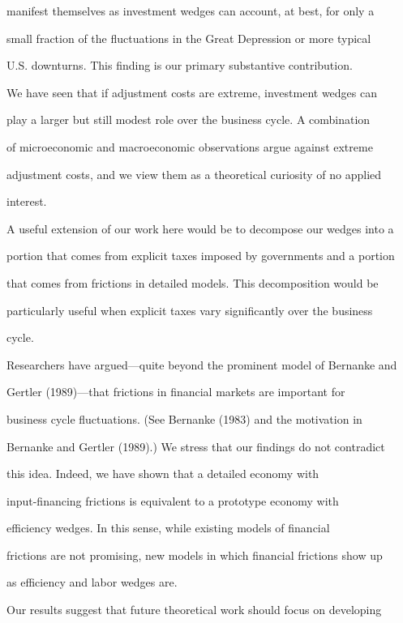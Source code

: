 \documentclass[fleqn,leqno,11pt]{article}
\begin{document}
manifest themselves as investment wedges can account, at best, for only a

small fraction of the fluctuations in the Great Depression or more typical

U.S. downturns. This finding is our primary substantive contribution.



We have seen that if adjustment costs are extreme, investment wedges can

play a larger but still modest role over the business cycle. A combination

of microeconomic and macroeconomic observations argue against extreme

adjustment costs, and we view them as a theoretical curiosity of no applied

interest.



A useful extension of our work here would be to decompose our wedges into a

portion that comes from explicit taxes imposed by governments and a portion

that comes from frictions in detailed models. This decomposition would be

particularly useful when explicit taxes vary significantly over the business

cycle.



Researchers have argued---quite beyond the prominent model of Bernanke and

Gertler (1989)---that frictions in financial markets are important for

business cycle fluctuations. (See Bernanke (1983) and the motivation in

Bernanke and Gertler (1989).) We stress that our findings do not contradict

this idea. Indeed, we have shown that a detailed economy with

input-financing frictions is equivalent to a prototype economy with

efficiency wedges. In this sense, while existing models of financial

frictions are not promising, new models in which financial frictions show up

as efficiency and labor wedges are.



Our results suggest that future theoretical work should focus on developing
\end{document}
